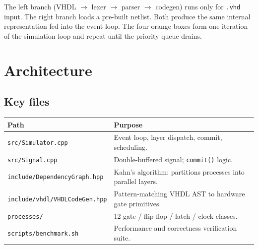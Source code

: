 \documentclass[9pt,a4paper]{article}
\begin{document}
\noindent The left branch (VHDL $\to$ lexer $\to$ parser $\to$ codegen) runs only for \texttt{.vhd} input. The right branch loads a pre-built netlist. Both produce the same internal representation fed into the event loop. The four orange boxes form one iteration of the simulation loop and repeat until the priority queue drains.

\section{Architecture}

\subsection{Key files}
\begin{center}\small
\begin{tabular}{@{}lp{10cm}@{}}
\toprule
Path & Purpose \\
\midrule
\texttt{src/Simulator.cpp} & Event loop, layer dispatch, commit, scheduling. \\
\texttt{src/Signal.cpp} & Double-buffered signal; \texttt{commit()} logic. \\
\texttt{include/DependencyGraph.hpp} & Kahn's algorithm: partitions processes into parallel layers. \\
\texttt{include/vhdl/VHDLCodeGen.hpp} & Pattern-matching VHDL AST to hardware gate primitives. \\
\texttt{processes/} & 12 gate / flip-flop / latch / clock classes. \\
\texttt{scripts/benchmark.sh} & Performance and correctness verification suite. \\
\bottomrule
\end{tabular}
\end{center}
\end{document}
